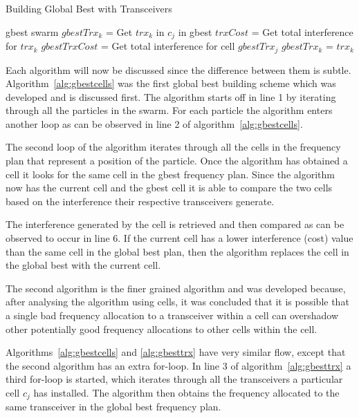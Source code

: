 \begin{algorithm}[H]
\caption{Building Global Best with Transceivers}
\label{alg:gbesttrx}
\begin{algorithmic}[1]
\Require gbest
\Require swarm
			\State $gbestTrx_k$ = Get $trx_k$ in $c_j$ in gbest
			\State $trxCost$ = Get total interference for $trx_k$
			\State $gbestTrxCost$ = Get total interference for cell $gbestTrx_j$
				\State $gbestTrx_k$ = $trx_k$
			\EndIf
		\EndFor
	\EndFor
\EndFor
\end{algorithmic}
\end{algorithm}
Each algorithm will now be discussed since the difference between them is subtle. Algorithm~\ref{alg:gbestcells} was the first global best building scheme which was developed and is discussed first. The algorithm starts off in line 1 by iterating through all the particles in the swarm. For each particle the algorithm enters another loop as can be observed in line 2 of algorithm~\ref{alg:gbestcells}.

The second loop of the algorithm iterates through all the cells in the frequency plan that represent a position of the particle. Once the algorithm has obtained a cell it looks for the same cell in the gbest frequency plan. Since the algorithm now has the current cell and the gbest cell it is able to compare the two cells based on the interference their respective transceivers generate.

The interference generated by the cell is retrieved and then compared as can be observed to occur in line 6. If the current cell has a lower interference (cost) value than the same cell in the global best plan, then the algorithm replaces the cell in the global best with the current cell.

The second algorithm is the finer grained algorithm and was developed because, after analysing the algorithm using cells, it was concluded that it is possible that a single bad frequency allocation to a transceiver within a cell can overshadow other potentially good frequency allocations to other cells within the cell.

Algorithms~\ref{alg:gbestcells} and \ref{alg:gbesttrx} have very similar flow, except that the second algorithm has an extra for-loop. In line 3 of algorithm~\ref{alg:gbesttrx} a third for-loop is started, which iterates through all the transceivers a particular cell $c_j$ has installed. The algorithm then obtains the frequency allocated to the same transceiver in the global best frequency plan.

